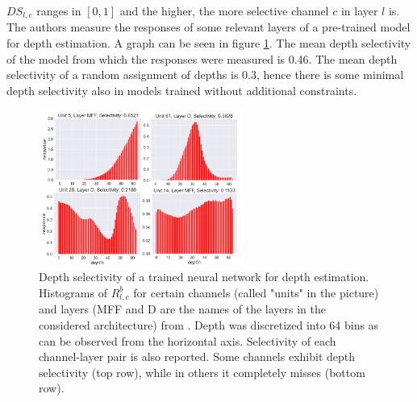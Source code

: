 $DS_{l, c}$ ranges in $[0, 1]$ and the higher, the more selective channel $c$ in layer $l$ is.
The authors measure the responses of some relevant layers of a pre-trained model for depth estimation.
A graph can be seen in figure \ref{fig:selectivity}.
The mean depth selectivity of the model from which the responses were measured is 0.46.
The mean depth selectivity of a random assignment of depths is 0.3, hence there is some minimal depth selectivity also in models trained without additional constraints.

\begin{figure}
    \centering
    \includegraphics[width=0.6\textwidth]{figs/selectivity}
    \caption{
        Depth selectivity of a trained neural network for depth estimation.
        Histograms of $R_{l,c}^{b}$ for certain channels (called "units" in the picture) and layers (MFF and D are the names of the layers in the considered architecture) from \cite{towards_interpretable}.
        Depth was discretized into 64 bins as can be observed from the horizontal axis.
        Selectivity of each channel-layer pair is also reported.
        Some channels exhibit depth selectivity (top row), while in others it completely misses (bottom row).
        \label{fig:selectivity}
    }
\end{figure}

